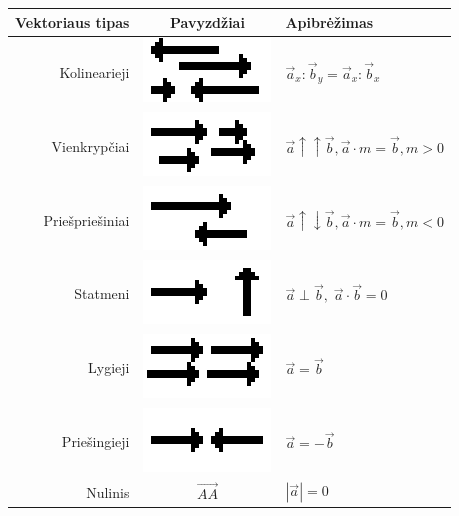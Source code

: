 \documentclass[fleqn]{article} %
\begin{document}
\begin{table}[h]
    \begin{tabular}{rcl}
        Vektoriaus tipas& Pavyzdžiai & Apibrėžimas \\ \hline
        Kolinearieji    & \includegraphics*[scale=0.25]{colinear_vectors.png} & $\vec{a}_x : \vec{b}_y = \vec{a}_x : \vec{b}_x$ \\
        Vienkrypčiai    & \includegraphics*[scale=0.25]{one-way_vectors.png} & $\vec{a} \uparrow \uparrow \vec{b}, \vec{a} \cdot m = \vec{b}, m > 0$  \\
        Priešpriešiniai & \includegraphics*[scale=0.25]{opposite-facing_vectors.png} & $\vec{a} \uparrow \downarrow \vec{b}, \vec{a} \cdot m = \vec{b}, m < 0$ \\
        Statmeni        & \includegraphics*[scale=0.25]{perpendicular_vectors.png} & $\vec{a} \perp \vec{b}, \;\vec{a} \cdot \vec{b} = 0 $ \\
        Lygieji         & \includegraphics*[scale=0.25]{equal_vectors.png} & $\vec{a} = \vec{b}$ \\
        Priešingieji    & \includegraphics*[scale=0.25]{opposite_vectors.png} & $\vec{a} = -\vec{b}$ \\
        Nulinis         & $\vec{AA}$ & $|\vec{a}| = 0$
    \end{tabular}
\end{table}
\end{document}
